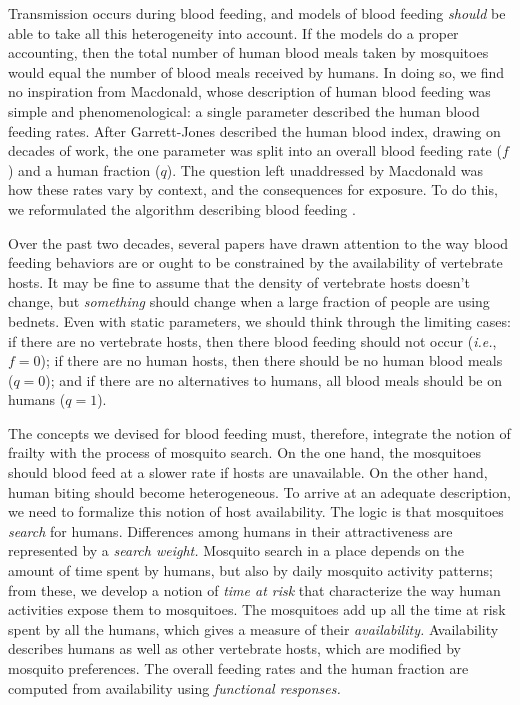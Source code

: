 \documentclass[
]{book}
\begin{document}
Transmission occurs during blood feeding, and models of blood feeding \emph{should} be able to take all this heterogeneity into account. If the models do a proper accounting, then the total number of human blood meals taken by mosquitoes would equal the number of blood meals received by humans. In doing so, we find no inspiration from Macdonald, whose description of human blood feeding was simple and phenomenological: a single parameter described the human blood feeding rates. After Garrett-Jones described the human blood index, drawing on decades of work, the one parameter was split into an overall blood feeding rate (\(f\)) and a human fraction (\(q\)). The question left unaddressed by Macdonald was how these rates vary by context, and the consequences for exposure. To do this, we reformulated the algorithm describing blood feeding \autocite{WuSL2023SpatialDynamics}.

Over the past two decades, several papers have drawn attention to the way blood feeding behaviors are or ought to be constrained by the availability of vertebrate hosts. It may be fine to assume that the density of vertebrate hosts doesn't change, but \emph{something} should change when a large fraction of people are using bednets. Even with static parameters, we should think through the limiting cases: if there are no vertebrate hosts, then there blood feeding should not occur (\emph{i.e.}, \(f=0\)); if there are no human hosts, then there should be no human blood meals (\(q=0\)); and if there are no alternatives to humans, all blood meals should be on humans (\(q=1\)).

The concepts we devised for blood feeding must, therefore, integrate the notion of frailty with the process of mosquito search. On the one hand, the mosquitoes should blood feed at a slower rate if hosts are unavailable. On the other hand, human biting should become heterogeneous. To arrive at an adequate description, we need to formalize this notion of host availability.
The logic is that mosquitoes \emph{search} for humans. Differences among humans in their attractiveness are represented by a \emph{search weight.} Mosquito search in a place depends on the amount of time spent by humans, but also by daily mosquito activity patterns; from these, we develop a notion of \emph{time at risk} that characterize the way human activities expose them to mosquitoes. The mosquitoes add up all the time at risk spent by all the humans, which gives a measure of their \emph{availability.} Availability describes humans as well as other vertebrate hosts, which are modified by mosquito preferences. The overall feeding rates and the human fraction are computed from availability using \emph{functional responses.}
\end{document}
